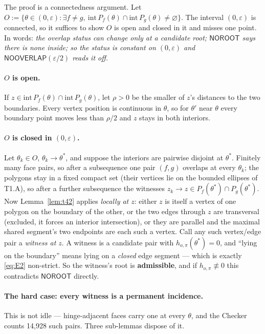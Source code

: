 \documentclass[11pt,a4paper]{article}
\theoremstyle{definition}
\newcommand{\NOOV}{\textsf{NOOVERLAP}}
\newcommand{\NOROOT}{\textsf{NOROOT}}
\begin{document}
The proof is a connectedness argument. Let
$O:=\{\theta\in(0,\varepsilon): \exists f\ne g,\ \mathrm{int}\,P_f(\theta)\cap
\mathrm{int}\,P_g(\theta)\ne\varnothing\}$. The interval $(0,\varepsilon)$ is connected, so
it suffices to show $O$ is open and closed in it and misses one point. In words: \emph{the
overlap status can change only at a candidate root; $\NOROOT$ says there is none inside; so
the status is constant on $(0,\varepsilon)$ and $\NOOV(\varepsilon/2)$ reads it off.}

\paragraph{$O$ is open.} If $z\in\mathrm{int}\,P_f(\theta)\cap\mathrm{int}\,P_g(\theta)$, let
$\rho>0$ be the smaller of $z$'s distances to the two boundaries. Every vertex position is
continuous in $\theta$, so for $\theta'$ near $\theta$ every boundary point moves less than
$\rho/2$ and $z$ stays in both interiors.

\paragraph{$O$ is closed in $(0,\varepsilon)$.} Let $\theta_k\in O$, $\theta_k\to\theta^*$,
and suppose the interiors are pairwise disjoint at $\theta^*$. Finitely many face pairs, so
after a subsequence one pair $(f,g)$ overlaps at every $\theta_k$; the polygons stay in a
fixed compact set (their vertices lie on the bounded ellipses of T1.A), so after a further
subsequence the witnesses $z_k\to z\in P_f(\theta^*)\cap P_g(\theta^*)$. Now
Lemma~\ref{lem:t42} applies \emph{locally at $z$}: either $z$ is itself a vertex of one
polygon on the boundary of the other, or the two edges through $z$ are transversal (excluded,
it forces an interior intersection), or they are parallel and the maximal shared segment's two
endpoints are each such a vertex. Call any such vertex/edge pair a \emph{witness at $z$}. A
witness is a candidate pair with $h_{o,\pi}(\theta^*)=0$, and ``lying on the boundary'' means
lying on a \emph{closed} edge segment --- which is exactly \eqref{eq:E2} non-strict. So the
witness's root is \textbf{admissible}, and if $h_{o,\pi}\not\equiv0$ this contradicts
$\NOROOT$ directly.

\paragraph{The hard case: every witness is a permanent incidence.} This is not idle ---
hinge-adjacent faces carry one at every $\theta$, and the Checker counts 14{,}928 such pairs.
Three sub-lemmas dispose of it.
\end{document}
